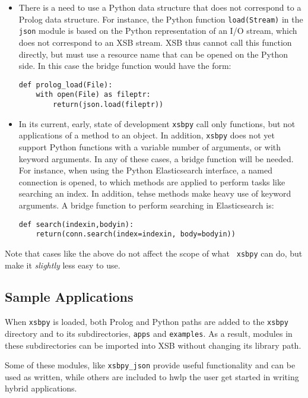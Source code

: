 \begin{itemize}
  \item There is a need to use a Python data structure that does not
    correspond to a Prolog data structure.  For instance, the Python
    function {\tt load(Stream)} in the {\tt json} module is based on
    the Python representation of an I/O stream, which does not
    correspond to an XSB stream.  XSB thus cannot call this function
    directly, but must use a resource name that can be opened on the
    Python side.  In this case the bridge function would have the
    form:

\begin{verbatim}   
def prolog_load(File):
    with open(File) as fileptr:
        return(json.load(fileptr))
\end{verbatim}

\item In its current, early, state of development {\tt xsbpy} call
  only functions, but not applications of a method to an object.  In
  addition, {\tt xsbpy} does not yet support Python functions with a
  variable number of arguments, or with keyword arguments.  In any of
  these cases, a bridge function will be needed.  For instance, when
  using the Python Elasticsearch interface, a named connection is
  opened, to which methods are applied to perform tasks like searching
  an index.  In addition, tehse methods make heavy use of keyword
  arguments.  A bridge function to perform searching in Elasticsearch
  is:

\begin{verbatim}
def search(indexin,bodyin):
    return(conn.search(index=indexin, body=bodyin))
\end{verbatim}
\end{itemize}

Note that cases like the above do not affect the scope of what {\tt
  xsbpy} can do, but make it {\em slightly} less easy to use.

\subsection{Sample Applications}

When {\tt xsbpy} is loaded, both Prolog and Python paths are added to
the {\tt xsbpy} directory and to its subdirectories, {\tt apps} and
{\tt examples}.  As a result, modules in these subdirectories can be
imported into XSB without changing its library path.

Some of these modules, like {\tt xsbpy\_json} provide useful
functionality and can be used as written, while others are included to
hwlp the user get started in writing hybrid applications.

